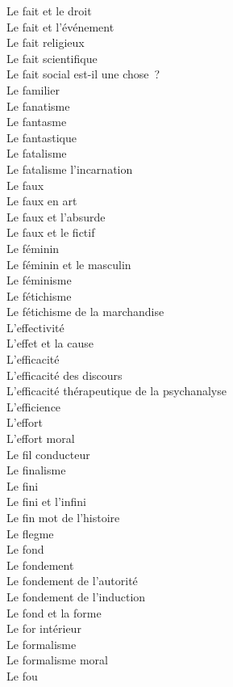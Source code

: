 \documentclass[a4paper,12pt]{article}
\begin{document}
Le fait et le droit \\
Le fait et l'événement \\
Le fait religieux \\
Le fait scientifique \\
Le fait social est-il une chose ? \\
Le familier \\
Le fanatisme \\
Le fantasme \\
Le fantastique \\
Le fatalisme \\
Le fatalisme l'incarnation \\
Le faux \\
Le faux en art \\
Le faux et l'absurde \\
Le faux et le fictif \\
Le féminin \\
Le féminin et le masculin \\
Le féminisme \\
Le fétichisme \\
Le fétichisme de la marchandise \\
L'effectivité \\
L'effet et la cause \\
L'efficacité \\
L'efficacité des discours \\
L'efficacité thérapeutique de la psychanalyse \\
L'efficience \\
L'effort \\
L'effort moral \\
Le fil conducteur \\
Le finalisme \\
Le fini \\
Le fini et l'infini \\
Le fin mot de l'histoire \\
Le flegme \\
Le fond \\
Le fondement \\
Le fondement de l'autorité \\
Le fondement de l'induction \\
Le fond et la forme \\
Le for intérieur \\
Le formalisme \\
Le formalisme moral \\
Le fou \\
\end{document}
